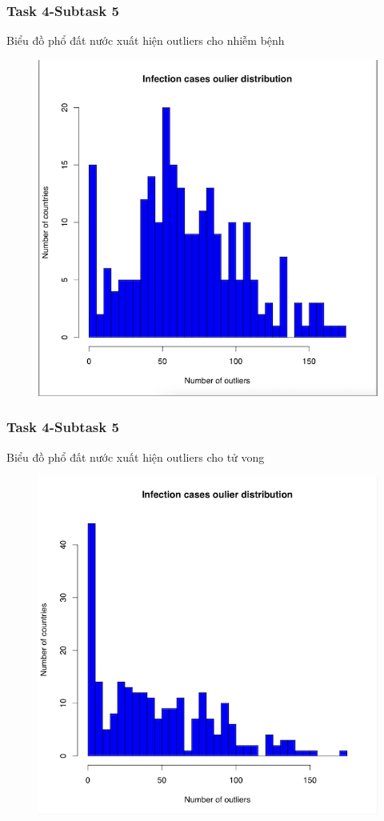\documentclass[english,10pt,table]{beamer}
\begin{document}
\frame
{
    \frametitle{Task 4-Subtask 5}
    \begin{block}{Biểu đồ phổ đất nước xuất hiện outliers cho nhiễm bệnh}
    \begin{figure}[H]
		\centering
		\includegraphics[scale=0.6]{images/4.5.png}
	\end{figure}
    \end{block}
}
\frame
{
    \frametitle{Task 4-Subtask 5}
    \begin{block}{Biểu đồ phổ đất nước xuất hiện outliers cho tử vong}
    \begin{figure}[H]
		\centering
		\includegraphics[scale=0.6]{images/4.6.png}
	\end{figure}
    \end{block}
}
\end{document}

